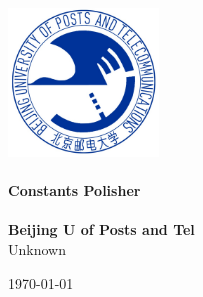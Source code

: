 \documentclass[12pt,a4paper]{ctexart}
\begin{document}
\begin{titlepage}
\begin{center}
\vspace*{0.5cm}
\includegraphics[width=0.3\textwidth]{logo.jpg} \\ [2cm]

\HRule \\ [1cm]
\textbf{\Huge{Constants Polisher}} \\ [0.5cm]
\HRule \\ [4cm]

\textbf{\Huge{Beijing U of Posts and Tel}} \\ [1cm]
\LARGE{Unknown}

\vfill
\Large{\today}
\end{center}
\clearpage

\tableofcontents
\pagestyle{empty}
\clearpage
\end{titlepage}



\end{document}
